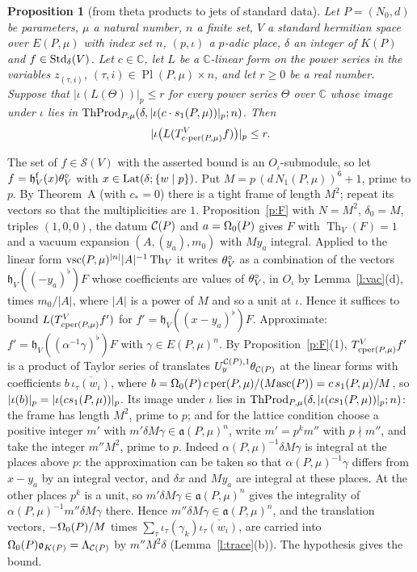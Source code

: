 \documentclass[11pt,a4paper]{article}
\makeatletter
\newcommand{\lean}[1]{\csname LN@#1\endcsname}
\newcommand{\leantag}{{\sffamily\bfseries\fontsize{6.3}{8}\selectfont\color{leancol}\addfontfeatures{LetterSpace=7}LEAN}}
\newcommand{\leanline}[1]{\par\nopagebreak\vspace{-2.5pt}{\fontsize{8.9}{12.4}\selectfont\color{inksoft}\raggedright
  \noindent\llap{\leantag\hspace{9pt}}#1\par}\vspace{1pt}}
\theoremstyle{plainx}
\newtheorem{proposition}[theorem]{Proposition}
\theoremstyle{uprightx}
\renewenvironment{proof}[1][Proof]{\par\pushQED{\qed}\normalfont\topsep0pt\partopsep0pt
  \trivlist\item[\hskip\labelsep\itshape #1.]\ignorespaces}{\popQED\endtrivlist\@endpefalse}
\newcommand{\CC}{\mathbb{C}}
\newcommand{\Oj}{O_\iota}
\newcommand{\np}[1]{|#1|_p}
\newcommand{\cj}[1]{\overline{#1}}
\newcommand{\OO}{\mathfrak{o}}
\newcommand{\KP}[1]{K(#1)}
\newcommand{\EP}[2]{E(#1,#2)}
\newcommand{\Nn}[2]{N_1(#1,#2)}
\newcommand{\PlP}[2]{\operatorname{Pl}(#1,#2)}
\newcommand{\emb}[1]{\iota_{#1}}
\newcommand{\alP}[2]{\alpha(#1,#2)}
\newcommand{\frl}[2]{\mathfrak{a}(#1,#2)}
\newcommand{\Sw}[1]{\mathcal{S}(#1)}
\newcommand{\heis}[2]{\mathfrak{h}_{#1}(#2)}
\newcommand{\fheis}[2]{\mathfrak{h}^{\mathrm{f}}_{#1}(#2)}
\newcommand{\fv}[1]{#1^{\flat}}
\newcommand{\Th}[1]{\operatorname{Th}_{#1}}
\newcommand{\jet}[3]{T^{#1}_{#2}#3}
\newcommand{\LamC}[1]{\Lambda_{#1}}
\newcommand{\thC}[1]{\theta_{#1}}
\newcommand{\UC}[3]{U^{#1,#2}_{#3}}
\makeatother
\begin{document}
\begin{proposition}[from theta products to jets of standard data]\label{p:transfer}
Let $P=(N_0,d)$ be parameters, $\mu$ a natural number, $n$ a finite set, $V$ a standard hermitian space over
$\EP{P}{\mu}$ with index set $n$, $(p,\iota)$ a $p$-adic place, $\delta$ an integer of $\KP{P}$ and
$f\in\mathrm{Std}_{\delta}(V)$. Let $c\in\CC$, let $L$ be a $\CC$-linear form on the power series in the variables
$z_{(\tau,i)}$, $(\tau,i)\in\PlP{P}{\mu}\times n$, and let $r\ge0$ be a real number. Suppose that
$\np{\iota(L(\Theta))}\le r$ for every power series $\Theta$ over $\CC$ whose image under $\iota$ lies in
$\ThProd{P}{\mu}{\delta}{\np{\iota(c\cdot\sone{P}{\mu})}}{n}$. Then
\[\np{\iota\bigl(L(\jet{V}{c\cdot\per{P}{\mu}}{f})\bigr)}\le r .\]
\end{proposition}
\begin{proof}
The set of $f\in\Sw{V}$ with the asserted bound is an $\Oj$-submodule, so let $f=\fheis{V}{x}\intvac{V}$ with
$x\in\mathrm{Lat}(\delta;\{w\mid p\})$. Put $M=p\,(d\,\Nn{P}{\mu})^6+1$, prime to $p$. By Theorem~A (with $c_\ast=0$) there
is a tight frame of length $M^2$; repeat its vectors so that the multiplicities are $1$. Proposition~\ref{p:F}
with $N=M^2$, $\delta_0=M$, triples $(1,0,0)$, the datum $\mathcal{C}(P)$ and $a=\Omega_0(P)$ gives $F$ with $\Th{V}(F)=1$ and
a vacuum expansion $(A,(y_a),m_0)$ with $My_a$ integral. Applied to the linear form $\vsc{P}{\mu}^{|n|}|A|^{-1}\Th{V}$
it writes $\theta^{\circ}_{V}$ as a combination of the vectors $\heis{V}{\fv{(-y_a)}}F$ whose coefficients are values of
$\theta^{\circ}_{V}$, in $\Oj$ by Lemma~\ref{l:vac}(d), times $m_0/|A|$, where $|A|$ is a power of $M$ and so a unit at $\iota$.
Hence it suffices to bound $L(\jet{V}{c\per{P}{\mu}}{f'})$ for $f'=\heis{V}{\fv{(x-y_a)}}F$. Approximate:
$f'=\heis{V}{\fv{(\alpha^{-1}\gamma)}}F$ with $\gamma\in\EP{P}{\mu}^n$. By Proposition~\ref{p:F}(1),
$\jet{V}{c\per{P}{\mu}}{f'}$ is a product of Taylor series of translates $\UC{\cmE{P}}{1}{y}\thC{\cmE{P}}$ at the
linear forms with coefficients $b\,\cj{\emb{\tau}(w_i)}$, where
$b=\Omega_0(P)\,c\,\mathrm{per}(P,\mu)/(M\mathrm{asc}(P))=c\,s_1(P,\mu)/M$, so $\np{\iota(b)}=\np{\iota(c\sone{P}{\mu})}$. Its image under
$\iota$ lies in $\ThProd{P}{\mu}{\delta}{\np{\iota(c\sone{P}{\mu})}}{n}$: the frame has length $M^2$, prime to $p$; and for
the lattice condition choose a positive integer $m'$ with $m'\delta M\gamma\in\frl{P}{\mu}^n$, write $m'=p^km''$
with $p\nmid m''$, and take the integer $m''M^2$, prime to $p$. Indeed $\alP{P}{\mu}^{-1}\delta M\gamma$ is integral at
the places above $p$: the approximation can be taken so that $\alP{P}{\mu}^{-1}\gamma$ differs from $x-y_a$ by
an integral vector, and $\delta x$ and $My_a$ are integral at these places. At the other places $p^k$ is a
unit, so $m'\delta M\gamma\in\frl{P}{\mu}^n$ gives the integrality of $\alP{P}{\mu}^{-1}m''\delta M\gamma$ there.
Hence $m''\delta M\gamma\in\frl{P}{\mu}^n$, and the translation vectors, $-\Omega_0(P)/M$ times
$\sum_\tau\emb{\tau}(\gamma_k)\cj{\emb{\tau}(w_i)}$, are carried into $\Omz{P}\OO_{\KP{P}}=\LamC{\cmE{P}}$ by
$m''M^2\delta$ (Lemma~\ref{l:trace}(b)). The hypothesis gives the bound.
\end{proof}
\leanline{\lean{normjetSeriesle}}
\end{document}
